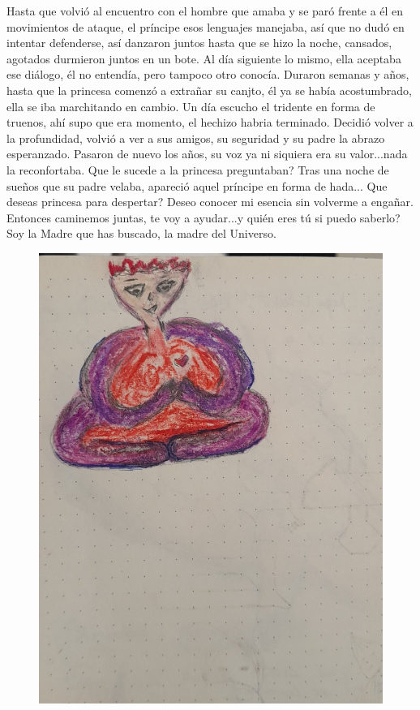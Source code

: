 \documentclass[12pt, a4paper, twoside]{book} %
\begin{document}
\clearpage

Hasta que volvió al encuentro con el hombre que amaba y se paró frente a él en movimientos de ataque, el príncipe esos lenguajes manejaba, así que no dudó en intentar defenderse, así danzaron juntos hasta que se hizo la noche, cansados, agotados durmieron juntos en un bote.
Al día siguiente lo mismo, ella aceptaba ese diálogo, él no entendía, pero tampoco otro conocía.
Duraron semanas y años, hasta que la princesa comenzó a extrañar su canjto, él ya se había acostumbrado, ella se iba marchitando en cambio.
Un día escucho el tridente en forma de truenos, ahí supo que era momento, el hechizo habria terminado.
Decidió volver a la profundidad, volvió a ver a sus amigos, su seguridad y su padre la abrazo esperanzado.
Pasaron de nuevo los años, su voz ya ni siquiera era su valor...nada la reconfortaba.
Que le sucede a la princesa preguntaban?
Tras una noche de sueños que su padre velaba, apareció aquel príncipe en forma de  hada...
Que deseas princesa para despertar? Deseo conocer mi esencia sin volverme a engañar.
Entonces caminemos juntas, te voy a ayudar...y quién eres tú si puedo saberlo?
Soy la Madre que has buscado, la madre del Universo.

\clearpage

\begin{figure}[H]
	\centering
	\includegraphics[width=\textwidth]{./images/1f81324dd8f012.jpg}
\end{figure}
\end{document}
